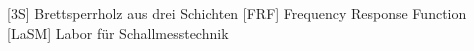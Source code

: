 %
%
%     
%
%
%
%
\begin{acronym}[----------] %
%
%
% 
   [3S]    {Brettsperrholz aus drei Schichten}
	[FRF]   {Frequency Response Function}
	[LaSM]  {Labor für Schallmesstechnik}
%
\end{acronym}